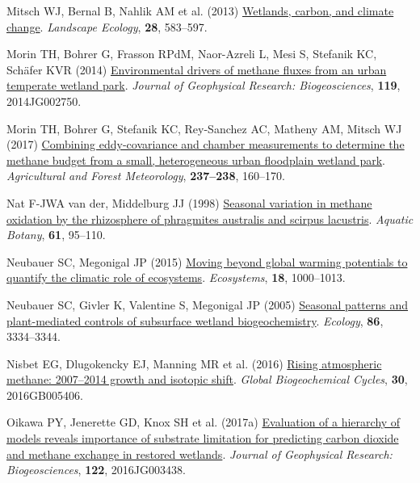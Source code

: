 \documentclass[
  12pt,
]{article}
\newlength{\cslhangindent}
\newenvironment{CSLReferences}[2] %
 {\begin{list}{}{%
  \setlength{\itemindent}{0pt}
  \setlength{\leftmargin}{0pt}
  \setlength{\parsep}{0pt}
  \ifodd #1
   \setlength{\leftmargin}{\cslhangindent}
   \setlength{\itemindent}{-1\cslhangindent}
  \fi
  \setlength{\itemsep}{#2\baselineskip}}}
 {\end{list}}
\begin{document}
\begin{CSLReferences}{1}{0}
Mitsch WJ, Bernal B, Nahlik AM et al. (2013)
\href{https://doi.org/10.1007/s10980-012-9758-8}{Wetlands, carbon, and
climate change}. \emph{Landscape Ecology}, \textbf{28}, 583--597.

Morin TH, Bohrer G, Frasson RPdM, Naor-Azreli L, Mesi S, Stefanik KC,
Schäfer KVR (2014)
\href{https://doi.org/10.1002/2014JG002750}{Environmental drivers of
methane fluxes from an urban temperate wetland park}. \emph{Journal of
Geophysical Research: Biogeosciences}, \textbf{119}, 2014JG002750.

Morin TH, Bohrer G, Stefanik KC, Rey-Sanchez AC, Matheny AM, Mitsch WJ
(2017) \href{https://doi.org/10.1016/j.agrformet.2017.01.022}{Combining
eddy-covariance and chamber measurements to determine the methane budget
from a small, heterogeneous urban floodplain wetland park}.
\emph{Agricultural and Forest Meteorology}, \textbf{237--238}, 160--170.

Nat F-JWA van der, Middelburg JJ (1998)
\href{https://doi.org/10.1016/S0304-3770(98)00072-2}{Seasonal variation
in methane oxidation by the rhizosphere of phragmites australis and
scirpus lacustris}. \emph{Aquatic Botany}, \textbf{61}, 95--110.

Neubauer SC, Megonigal JP (2015)
\href{https://doi.org/10.1007/s10021-015-9879-4}{Moving beyond global
warming potentials to quantify the climatic role of ecosystems}.
\emph{Ecosystems}, \textbf{18}, 1000--1013.

Neubauer SC, Givler K, Valentine S, Megonigal JP (2005)
\href{https://doi.org/10.1890/04-1951}{Seasonal patterns and
plant-mediated controls of subsurface wetland biogeochemistry}.
\emph{Ecology}, \textbf{86}, 3334--3344.

Nisbet EG, Dlugokencky EJ, Manning MR et al. (2016)
\href{https://doi.org/10.1002/2016GB005406}{Rising atmospheric methane:
2007--2014 growth and isotopic shift}. \emph{Global Biogeochemical
Cycles}, \textbf{30}, 2016GB005406.

Oikawa PY, Jenerette GD, Knox SH et al. (2017a)
\href{https://doi.org/10.1002/2016JG003438}{Evaluation of a hierarchy of
models reveals importance of substrate limitation for predicting carbon
dioxide and methane exchange in restored wetlands}. \emph{Journal of
Geophysical Research: Biogeosciences}, \textbf{122}, 2016JG003438.


\end{CSLReferences}
\end{document}
